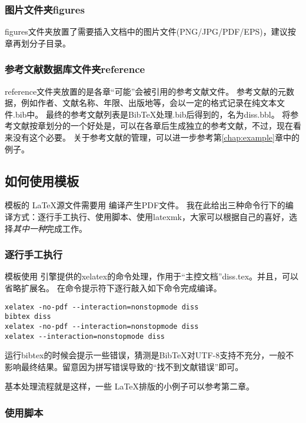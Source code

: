 \subsubsection{图片文件夹figures}
\label{sec:figuresdir}

figures文件夹放置了需要插入文档中的图片文件(PNG/JPG/PDF/EPS)，建议按章再划分子目录。

\subsubsection{参考文献数据库文件夹reference}
\label{sec:bibdir}

reference文件夹放置的是各章``可能''会被引用的参考文献文件。
参考文献的元数据，例如作者、文献名称、年限、出版地等，会以一定的格式记录在纯文本文件.bib中。
最终的参考文献列表是BibTeX处理.bib后得到的，名为diss.bbl。
将参考文献按章划分的一个好处是，可以在各章后生成独立的参考文献，不过，现在看来没有这个必要。
关于参考文献的管理，可以进一步参考第\ref{chap:example}章中的例子。

\subsection{如何使用模板}
\label{sec:process}

模板的 \LaTeX 源文件需要用 \XeTeX 编译产生PDF文件。
我在此给出三种命令行下的编译方式：逐行手工执行、使用脚本、使用latexmk，大家可以根据自己的喜好，选择\emph{其中一种}完成工作。

\subsubsection{逐行手工执行}

模板使用 \XeTeX 引擎提供的xelatex的命令处理，作用于“主控文档”diss.tex。并且，可以省略扩展名。
在命令提示符下逐行敲入如下命令完成编译。

\begin{lstlisting}[basicstyle=\small\ttfamily, caption={手动执行编译过程}, numbers=none]
xelatex -no-pdf --interaction=nonstopmode diss
bibtex diss 
xelatex -no-pdf --interaction=nonstopmode diss 
xelatex --interaction=nonstopmode diss 
\end{lstlisting}

运行bibtex的时候会提示一些错误，猜测是{{\sc Bib}\TeX}对UTF-8支持不充分，一般不影响最终结果。留意因为拼写错误导致的``找不到文献错误''即可。

基本处理流程就是这样，一些 \LaTeX 排版的小例子可以参考第二章。

\subsubsection{使用脚本}

